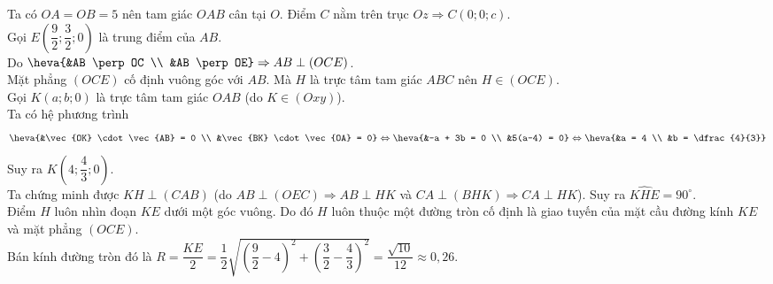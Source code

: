 \begin{ex}
{\begin{center}
			\end{center}			
			Ta có $OA = OB = 5$ nên tam giác $OAB$ cân tại $O$. Điểm $C$ nằm trên trục $Oz \Rightarrow C(0; 0; c)$.\\			
			Gọi $E\left(\dfrac{9}{2}; \dfrac{3}{2}; 0\right)$ là trung điểm của $AB$. \\			
			Do $\heva{&AB \perp OC \\ &AB \perp OE}\Rightarrow AB \perp (OCE)$.\\			
			Mặt phẳng $(OCE)$ cố định vuông góc với $AB$. Mà $H$ là trực tâm tam giác $ABC$ nên $H \in (OCE)$.\\			
			Gọi $K(a; b; 0)$ là trực tâm tam giác $OAB$ (do $K \in (Oxy)$).\\			
			Ta có hệ phương trình
			\allowdisplaybreaks 
			\begin{eqnarray*} 
				\heva{&\vec{OK} \cdot \vec{AB} = 0 \\ &\vec{BK} \cdot \vec{OA} = 0} \Leftrightarrow \heva{&-a + 3b = 0 \\ &5(a-4) = 0}  \Leftrightarrow \heva{&a = 4 \\ &b = \dfrac{4}{3}}
			\end{eqnarray*} 
			Suy ra $K\left(4; \dfrac{4}{3}; 0\right)$.\\			
			Ta chứng minh được $KH \perp (CAB)$ (do $AB \perp (OEC) \Rightarrow AB \perp HK$ và $CA \perp (BHK) \Rightarrow CA \perp HK$).
			Suy ra $\widehat{KHE} = 90^\circ$.\\			
			Điểm $H$ luôn nhìn đoạn $KE$ dưới một góc vuông.
			Do đó $H$ luôn thuộc một đường tròn cố định là giao tuyến của mặt cầu đường kính $KE$ và mặt phẳng $(OCE)$.\\			
			Bán kính đường tròn đó là $R = \dfrac{KE}{2} = \dfrac{1}{2}\sqrt{\left(\dfrac{9}{2} - 4\right)^2 + \left(\dfrac{3}{2} - \dfrac{4}{3}\right)^2} = \dfrac{\sqrt{10}}{12} \approx 0{,}26$.		
	}
\end{ex}

